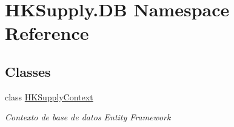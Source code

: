 \hypertarget{namespace_h_k_supply_1_1_d_b}{}\section{H\+K\+Supply.\+DB Namespace Reference}
\label{namespace_h_k_supply_1_1_d_b}
\subsection*{Classes}
\begin{DoxyCompactItemize}
\item 
class \hyperlink{class_h_k_supply_1_1_d_b_1_1_h_k_supply_context}{H\+K\+Supply\+Context}
\begin{DoxyCompactList}\small\item\em Contexto de base de datos Entity Framework \end{DoxyCompactList}\end{DoxyCompactItemize}
